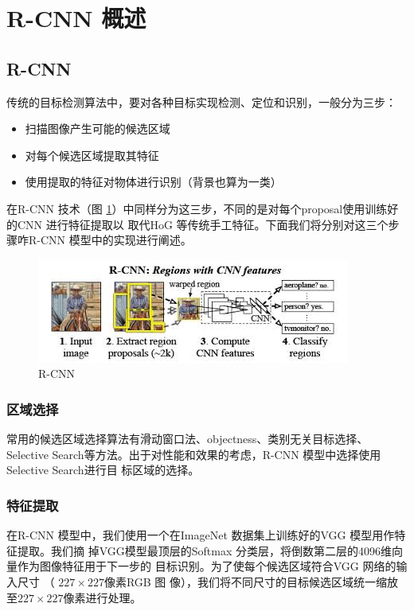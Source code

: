 \section{R-CNN 概述}

\subsection{R-CNN}

传统的目标检测算法中，要对各种目标实现检测、定位和识别，一般分为三步：

\begin{itemize}
  \item 扫描图像产生可能的候选区域
  \item 对每个候选区域提取其特征
  \item 使用提取的特征对物体进行识别（背景也算为一类）
\end{itemize}

在R-CNN 技术（图 \ref{Fig:RCNN}）中同样分为这三步，不同的是对每个proposal使用训练好的CNN 进行特征提取以
取代HoG 等传统手工特征。下面我们将分别对这三个步骤咋R-CNN 模型中的实现进行阐述。

\begin{figure}
  \centering
  \includegraphics[width=0.8\linewidth]{./Figure/RCNN.jpg}
  \caption{R-CNN}\label{Fig:RCNN}
\end{figure}

\subsubsection{区域选择}

常用的候选区域选择算法有滑动窗口法、objectness、类别无关目标选择、Selective
Search等方法。出于对性能和效果的考虑，R-CNN 模型中选择使用 Selective Search进行目
标区域的选择。

\subsubsection{特征提取}

在R-CNN 模型中，我们使用一个在ImageNet 数据集上训练好的VGG 模型用作特征提取。我们摘
掉VGG模型最顶层的Softmax 分类层，将倒数第二层的4096维向量作为图像特征用于下一步的
目标识别。为了使每个候选区域符合VGG 网络的输入尺寸 （ $227 \times 227$像素RGB 图
像），我们将不同尺寸的目标候选区域统一缩放至$227 \times 227$像素进行处理。


